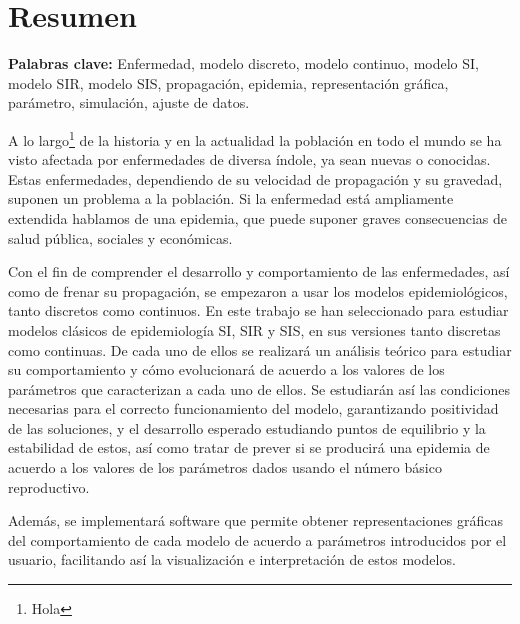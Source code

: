 

\chapter*{Resumen}

\textbf{Palabras clave: } Enfermedad, modelo discreto, modelo continuo, modelo SI, modelo SIR, modelo SIS, propagación, epidemia, representación gráfica, parámetro, simulación, ajuste de datos.

A lo largo\footnote{Hola} de la historia y en la actualidad la población en todo el mundo se ha visto afectada por enfermedades de diversa índole, ya sean nuevas o conocidas. Estas enfermedades, dependiendo de su velocidad de propagación y su gravedad, suponen un problema a la población. Si la enfermedad está ampliamente extendida hablamos de una epidemia, que puede suponer graves consecuencias de salud pública, sociales y económicas.

Con el fin de comprender el desarrollo y comportamiento de las enfermedades, así como de frenar su propagación, se empezaron a usar los modelos epidemiológicos, tanto discretos como continuos. En este trabajo se han seleccionado para estudiar modelos clásicos de epidemiología SI, SIR y SIS, en sus versiones tanto discretas como continuas. De cada uno de ellos se realizará un análisis teórico para estudiar su comportamiento y cómo evolucionará de acuerdo a los valores de los parámetros que caracterizan a cada uno de ellos. Se estudiarán así las condiciones necesarias para el correcto funcionamiento del modelo, garantizando positividad de las soluciones, y el desarrollo esperado estudiando puntos de equilibrio y la estabilidad de estos, así como tratar de prever si se producirá una epidemia de acuerdo a los valores de los parámetros dados usando el número básico reproductivo.

Además, se implementará software que permite obtener representaciones gráficas del comportamiento de cada modelo de acuerdo a parámetros introducidos por el usuario, facilitando así la visualización e interpretación de estos modelos.

